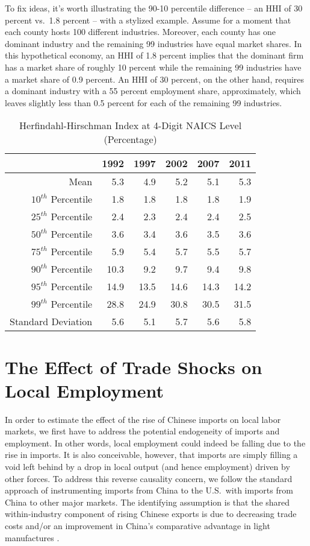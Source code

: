 \documentclass[onehalfspacing,11pt]{article}
\begin{document}
To fix ideas, it's worth illustrating the 90-10 percentile difference -- an HHI of 30 percent vs.~1.8 percent -- with a stylized example. Assume for a moment that each county hosts 100 different industries. Moreover, each county has one dominant industry and the remaining 99 industries have equal market shares. In this hypothetical economy, an HHI of 1.8 percent implies that the dominant firm has a market share of roughly 10 percent while the remaining 99 industries have a market share of 0.9 percent. An HHI of 30 percent, on the other hand, requires a dominant industry with a 55 percent employment share, approximately, which leaves slightly less than 0.5 percent for each of the remaining 99 industries.

\begin{table}
  \centering 
  \begin{tabular*}{.85\textwidth}{@{\extracolsep{\fill}} rrrrrr}
  \toprule
& 1992 & 1997 & 2002 & 2007 & 2011 \\
\midrule
Mean   			 & 5.3 & 4.9 & 5.2 & 5.1 & 5.3\\
$10^{th}$ Percentile   & 1.8 & 1.8 & 1.8 & 1.8 & 1.9 \\
$25^{th}$ Percentile   & 2.4 & 2.3 & 2.4 & 2.4 & 2.5 \\
$50^{th}$ Percentile   & 3.6 & 3.4 & 3.6 & 3.5 & 3.6 \\
$75^{th}$ Percentile   & 5.9 & 5.4 & 5.7 & 5.5 & 5.7 \\
$90^{th}$ Percentile   & 10.3 & 9.2 & 9.7 & 9.4 & 9.8 \\
$95^{th}$ Percentile   & 14.9 & 13.5 & 14.6 & 14.3 & 14.2 \\
$99^{th}$ Percentile   & 28.8 & 24.9 & 30.8 & 30.5 & 31.5\\
Standard Deviation	 & 5.6 & 5.1 & 5.7 & 5.6 & 5.8 \\
\bottomrule
\end{tabular*}
  \caption{Herfindahl-Hirschman Index at 4-Digit NAICS Level (Percentage)}\label{tab:hhi4}
\end{table}

\section{The Effect of Trade Shocks on Local Employment}
In order to estimate the effect of the rise of Chinese imports on local labor markets, we first have to address the potential endogeneity of imports and employment. In other words, local employment could indeed be falling due to the rise in imports. It is also conceivable, however, that imports are simply filling a void left behind by a drop in local output (and hence employment) driven by other forces. To address this reverse causality concern, we follow the standard approach of instrumenting imports from China to the U.S.~with imports from China to other major markets. The identifying assumption is that the shared within-industry component of rising Chinese exports is due to decreasing trade costs and/or an improvement in China's comparative advantage in light manufactures \citep[see][for a detailed discussion of the instrumental variable strategy]{Autor:2013}.
\end{document}
